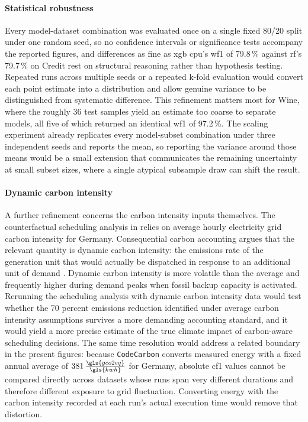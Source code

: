 \paragraph{Statistical robustness}
Every model-dataset combination was evaluated once on a single fixed 80/20 split under one random seed, so no confidence intervals or significance tests accompany the reported figures, and differences as fine as \gls{xgb} \gls{cpu}'s \gls{wf1} of 79.8\,\% against \gls{rf}'s 79.7\,\% on Credit rest on structural reasoning rather than hypothesis testing. Repeated runs across multiple seeds or a repeated k-fold evaluation would convert each point estimate into a distribution and allow genuine variance to be distinguished from systematic difference. This refinement matters most for Wine, where the roughly 36 test samples yield an estimate too coarse to separate models, all five of which returned an identical \gls{wf1} of 97.2\,\%. The scaling experiment already replicates every model-subset combination under three independent seeds and reports the mean, so reporting the variance around those means would be a small extension that communicates the remaining uncertainty at small subset sizes, where a single atypical subsample draw can shift the result.

\paragraph{Dynamic carbon intensity}
A further refinement concerns the carbon intensity inputs themselves. The counterfactual scheduling analysis in  relies on average hourly electricity grid carbon intensity for Germany. Consequential carbon accounting argues that the relevant quantity is dynamic carbon intensity: the emissions rate of the generation unit that would actually be dispatched in response to an additional unit of demand \cite{dodgeMeasuringCarbonIntensity2022}. Dynamic carbon intensity is more volatile than the average and frequently higher during demand peaks when fossil backup capacity is activated. Rerunning the scheduling analysis with dynamic carbon intensity data would test whether the 70 percent emissions reduction identified under average carbon intensity assumptions survives a more demanding accounting standard, and it would yield a more precise estimate of the true climate impact of carbon-aware scheduling decisions. The same time resolution would address a related boundary in the present figures: because \texttt{CodeCarbon} converts measured energy with a fixed annual average of $381\,\frac{\gls{gco2eq}}{\gls{kwh}}$ for Germany, absolute \gls{cf1} values cannot be compared directly across datasets whose runs span very different durations and therefore different exposure to grid fluctuation. Converting energy with the carbon intensity recorded at each run's actual execution time would remove that distortion.

